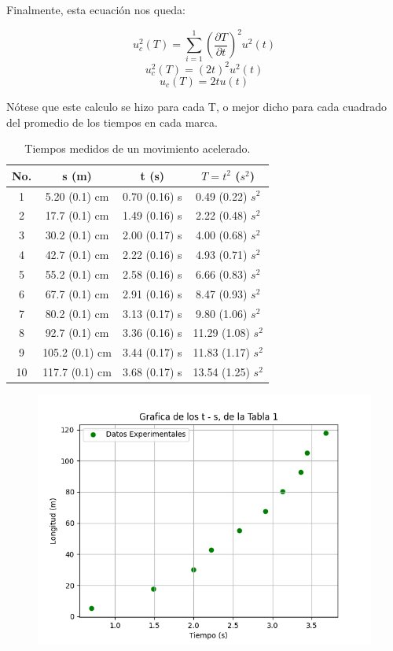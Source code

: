 \documentclass[12pt,a4paper]{article}
\begin{document}
Finalmente, esta ecuación nos queda:

\[u^2_c (T) = \sum_{i = 1}^1 \left( \frac{\partial T}{\partial t}\right)^2 u^2(t)\]
\[u^2_c (T) = (2t)^2 u^2(t)\]
\[u_c (T) = 2t u(t)\]

Nótese que este calculo se hizo para cada T, o mejor dicho para cada cuadrado del promedio de los tiempos en cada marca. 


\begin{table}[h!]
\begin{center}
\begin{tabular}{|c|c|c|c|}
\hline
No. & s (m) & t (s) & $T = t^2$ ($s^2$)\\
\hline
1 & 5.20 (0.1) cm & 0.70 (0.16) s & 0.49 (0.22) $s^2$ \\ \hline
2 & 17.7 (0.1) cm & 1.49 (0.16) s & 2.22 (0.48) $s^2$ \\ \hline
3 & 30.2 (0.1) cm & 2.00 (0.17) s & 4.00 (0.68) $s^2$ \\ \hline
4 & 42.7 (0.1) cm & 2.22 (0.16) s & 4.93 (0.71) $s^2$ \\ \hline
5 & 55.2 (0.1) cm & 2.58 (0.16) s & 6.66 (0.83) $s^2$ \\ \hline
6 & 67.7 (0.1) cm & 2.91 (0.16) s & 8.47 (0.93) $s^2$ \\ \hline
7 & 80.2 (0.1) cm & 3.13 (0.17) s & 9.80 (1.06) $s^2$ \\ \hline
8 & 92.7 (0.1) cm & 3.36 (0.16) s & 11.29 (1.08) $s^2$ \\ \hline
9 & 105.2 (0.1) cm & 3.44 (0.17) s & 11.83 (1.17) $s^2$ \\ \hline
10 & 117.7 (0.1) cm & 3.68 (0.17) s & 13.54 (1.25) $s^2$ \\ \hline
\end{tabular}
\caption{Tiempos medidos de un movimiento acelerado. }
\end{center}
\end{table}

\begin{figure}[h!]
\centering
\includegraphics[scale=0.68]{t-s.png}
\end{figure}
\end{document}
